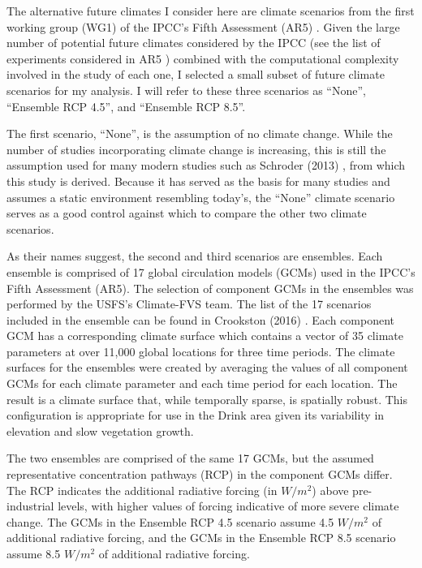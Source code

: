 The alternative future climates I consider here are climate scenarios from the first working group (WG1) of the IPCC's Fifth Assessment (AR5) \cite{ipcc2013climate}. Given the large number of potential future climates considered by the IPCC (see the list of experiments considered in AR5 \cite{ipccListOfAR5Models}) combined with the computational complexity involved in the study of each one, I selected a small subset of  future climate scenarios for my analysis. I will refer to these three scenarios as ``None'', ``Ensemble RCP 4.5'', and ``Ensemble RCP 8.5''.

The first scenario, ``None'', is the assumption of no climate change. While the number of studies incorporating climate change is increasing, this is still the assumption used for many modern studies such as Schroder (2013) \cite{svetlanaDissertation2013}, from which this study is derived. Because it has served as the basis for many studies and assumes a static environment resembling today's, the ``None'' climate scenario serves as a good control against which to compare the other two climate scenarios.

As their names suggest, the second and third scenarios are ensembles. Each ensemble is comprised of 17 global circulation models (GCMs) used in the IPCC's Fifth Assessment (AR5). The selection of component GCMs in the ensembles was performed by the USFS's Climate-FVS \cite{dixon2002essential} team. The list of the 17 scenarios included in the ensemble can be found in Crookston (2016) \cite{ClimateModelsInFVSEnsemble}. Each component GCM has a corresponding climate surface which contains a vector of 35 climate parameters at over 11,000 global locations for three time periods. The climate surfaces for the ensembles were created by averaging the values of all component GCMs for each climate parameter and each time period for each location. The result is a climate surface that, while temporally sparse, is spatially robust. This configuration is appropriate for use in the Drink area given its variability in elevation and slow vegetation growth.

The two ensembles are comprised of the same 17 GCMs, but the assumed representative concentration pathways (RCP) in the component GCMs differ. The RCP indicates the additional radiative forcing (in $W/m^2$) above pre-industrial levels, with higher values of forcing indicative of more severe climate change. The GCMs in the Ensemble RCP 4.5 scenario assume 4.5 $W/m^2$ of additional radiative forcing, and the GCMs in the Ensemble RCP 8.5 scenario assume 8.5 $W/m^2$ of additional radiative forcing.


